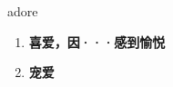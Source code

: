
\begin{frame}
{\huge adore}
\begin{center}
\begin{enumerate}\Large
  \item \textbf{喜爱，因···感到愉悦}
  \item \textbf{宠爱}
\end{enumerate}
\end{center}
\end{frame}
